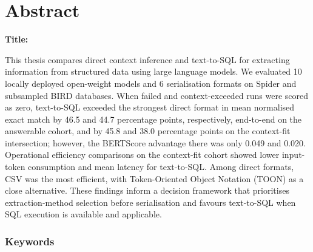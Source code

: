 \chapter*{Abstract}

\noindent\textbf{Title:} \ttitleEn
\bigskip

This thesis compares direct context inference and text-to-SQL for extracting information from structured data
using large language models. We evaluated \num{10} locally deployed open-weight models and \num{6}
serialisation formats on Spider and subsampled BIRD databases. When failed and context-exceeded runs were
scored as zero, text-to-SQL exceeded the strongest direct format in mean normalised exact match by \num{46.5}
and \num{44.7} percentage points, respectively, end-to-end on the answerable cohort, and by \num{45.8} and
\num{38.0} percentage points on the context-fit intersection; however, the BERTScore advantage there was only
\num{0.049} and \num{0.020}. Operational efficiency comparisons on the context-fit cohort showed lower
input-token consumption and mean latency for text-to-SQL. Among direct formats, CSV was the most efficient,
with Token-Oriented Object Notation (TOON) as a close alternative. These findings inform a decision framework
that prioritises extraction-method selection before serialisation and favours text-to-SQL when SQL execution
is available and applicable.

\subsection*{Keywords}
\textit{\tkeywordsEn}
\clearemptydoublepage
